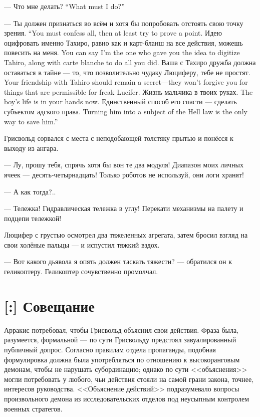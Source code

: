 {--- Что мне делать?}
{``What must I do?''}

{--- Ты должен признаться во всём и хотя бы попробовать отстоять свою точку зрения.}
{``You must confess all, then at least try to prove a point.}
{Идею оцифровать именно Тахиро, равно как и карт-бланш на все действия, можешь повесить на меня.}
{You can say I'm the one who gave you the idea to digitize Tahiro, along with carte blanche to do all you did.}
{Ваша с Тахиро дружба должна оставаться в тайне --- то, что позволительно чудаку Люциферу, тебе не простят.}
{Your friendship with Tahiro should remain a secret---they won't forgive you for things that are permissible for freak Lucifer.}
{Жизнь мальчика в твоих руках.}
{The boy's life is in your hands now.}
{Единственный способ его спасти --- сделать субъектом адского права.}
{Turning him into a subject of the Hell law is the only way to save him.''}

Грисвольд сорвался с места с неподобающей толстяку прытью и понёсся к выходу из ангара.

--- Лу, прошу тебя, спрячь хотя бы вон те два модуля!
Диапазон моих личных ячеек --- десять-четырнадцать!
Только роботов не используй, они логи хранят!

--- А как тогда?..

--- Тележка!
Гидравлическая тележка в углу!
Перекати механизмы на палету и подцепи тележкой!

Люцифер с грустью осмотрел два тяжеленных агрегата, затем бросил взгляд на свои холёные пальцы --- и испустил тяжкий вздох.

--- Вот какого дьявола я опять должен таскать тяжести? --- обратился он к геликоптеру.
Геликоптер сочувственно промолчал.

\section{[:] Совещание}

\textspace

Арракис потребовал, чтобы Грисвольд объяснил свои действия.
Фраза была, разумеется, формальной --- по сути Грисвольду предстоял завуалированный публичный допрос.
Согласно правилам отдела пропаганды, подобная формулировка должна была употребляться по отношению к высокоранговым демонам, чтобы не нарушать субординацию;
однако по сути <<объяснения>> могли потребовать у любого, чьи действия стояли на самой грани закона, точнее, интересов руководства.
<<Объяснение действий>> подразумевало вопросы произвольного демона из исследовательских отделов под неусыпным контролем военных стратегов.

